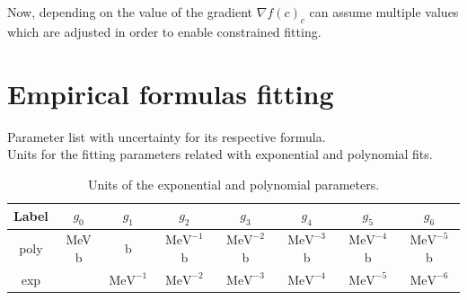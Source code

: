 \documentclass[openany]{book}
\begin{document}
Now, depending on the value of the gradient $\nabla f(c)_c$ can assume multiple values which are adjusted in order to enable constrained fitting. 


\section{Empirical formulas fitting} \label{sec:empiricalFitting}

Parameter list with uncertainty for its respective formula.  \\

Units for the fitting parameters related with exponential and polynomial fits.

\begin{table}[H]
	\centering
	\begin{tabular}{|c|c|c|c|c|c|c|c|}
		\hline
		Label & $g_0$ & $g_1$  & $g_2$   & $g_3$ &  $g_4$ &  $g_5$ & $g_6$   \\  \hline
		poly &  MeV b & b & $\mathrm{{MeV}^{-1}}$ b &  $\mathrm{{MeV}^{-2}}$ b &  $\mathrm{{MeV}^{-3}}$ b & $\mathrm{{MeV}^{-4}}$ b & $\mathrm{{MeV}^{-5}}$ b  \\  \hline
		exp &  &  $\mathrm{{MeV}^{-1}}$  & $\mathrm{{MeV}^{-2}}$  &  $\mathrm{{MeV}^{-3}}$  &  $\mathrm{{MeV}^{-4}}$  &  $\mathrm{{MeV}^{-5}}$ & $\mathrm{{MeV}^{-6}}$    \\ \hline
	\end{tabular}
	\caption[Units of the exponential and polynomial parameters.]{Units of the exponential and polynomial parameters.}
	\label{table:fitting_empirical_polyexp_units}
\end{table}
\end{document}
